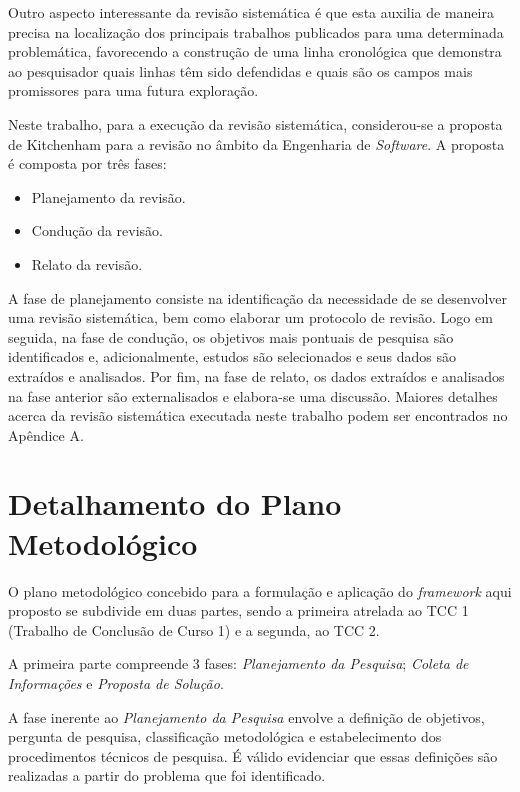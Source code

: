Outro aspecto interessante da revisão sistemática é que esta auxilia de maneira precisa na localização dos principais trabalhos publicados para uma determinada problemática, favorecendo a construção de uma linha cronológica que demonstra ao pesquisador quais linhas têm sido defendidas e quais são os campos mais promissores para uma futura exploração.

Neste trabalho, para a execução da revisão sistemática, considerou-se a proposta de Kitchenham para a revisão no âmbito da Engenharia de \textit{Software}. A proposta é composta por três fases:

\begin{itemize}
	\item Planejamento da revisão.
	\item Condução da revisão.
	\item Relato da revisão.
\end{itemize}

A fase de planejamento consiste na identificação da necessidade de se desenvolver uma revisão sistemática, bem como elaborar um protocolo de revisão. Logo em seguida, na fase de condução, os objetivos mais pontuais de pesquisa são identificados e, adicionalmente, estudos são selecionados e seus dados são extraídos e analisados. Por fim, na fase de relato, os dados extraídos e analisados na fase anterior são externalisados e elabora-se uma discussão. Maiores detalhes acerca da revisão sistemática executada neste trabalho podem ser encontrados no Apêndice A.

\section{Detalhamento do Plano Metodológico}

O plano metodológico concebido para a formulação e aplicação do \textit{framework} aqui proposto se subdivide em duas partes, sendo a primeira atrelada ao TCC 1 (Trabalho de Conclusão de Curso 1) e a segunda, ao TCC 2.

A primeira parte compreende 3 fases: \textit{Planejamento da Pesquisa}; \textit{Coleta de Informações} e \textit{Proposta de Solução}.

A fase inerente ao \textit{Planejamento da Pesquisa} envolve a definição de objetivos, pergunta de pesquisa, classificação metodológica e estabelecimento dos procedimentos técnicos de pesquisa. É válido evidenciar que essas definições são realizadas a partir do problema que foi identificado.

